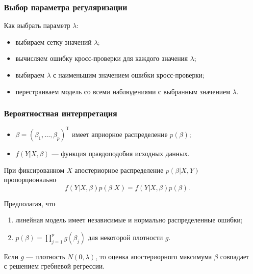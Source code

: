 \documentclass[unicode, notheorems]{beamer}
\newcommand{\T}{\mathrm{T}}
\begin{document}
\begin{frame}
\frametitle{Выбор параметра регуляризации}

Как выбрать параметр $\lambda$:
\begin{itemize}
\item выбираем сетку значений $\lambda$;
\item вычисляем ошибку кросс-проверки для каждого значения $\lambda$;
\item выбираем $\lambda$ с наименьшим значением ошибки кросс-проверки;
\item перестраиваем модель со всеми наблюдениями с выбранным значением $\lambda$.
\end{itemize}






\end{frame}





\begin{frame}
\frametitle{Вероятностная интерпретация} 

\begin{itemize}
\item $\beta = (\beta_1, \ldots, \beta_p)^{\T}$ имеет априорное распределение $p(\beta)$;
\item $f(Y|X,\beta)$ --- функция правдоподобия исходных данных. 
\end{itemize}

\vspace{0.3cm}
При фиксированном $X$ апостериорное распределение $p(\beta|X,Y)$ пропорционально 
\[f(Y|X,\beta)p(\beta|X) = f(Y|X,\beta)p(\beta).\]

Предполагая, что 
\begin{enumerate}
\item линейная модель имеет независимые и нормально распределенные ошибки; 
\item $p(\beta) = \prod_{j = 1}^p g(\beta_j)$ для некоторой плотности $g$.
\end{enumerate}

\vspace{0.5cm}
Если $g$ --- плотность $N(0,\lambda)$, то  оценка апостериорного максимума $\beta$ совпадает с решением гребневой регрессии.

\end{frame}
\end{document}
